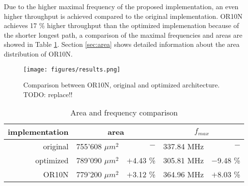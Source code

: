 Due to the higher maximal frequency of the proposed implementation, an even higher throughput is achieved compared to the original implementation. OR10N achieves 17 \% higher throughput than the optimized implemenation because of the shorter longest path, a comparison of the maximal frequencies and areas are showed in Table \ref{tab:area_cmp}. Section \ref{sec:area} shows detailed information about the area distribution of OR10N.

\begin{figure}[t!]
\centering
%
\texttt{[image: figures/results.png]}
\caption{Comparison between OR10N, original and optimized architecture. TODO: replace!!}
\label{fig:results}

\end{figure}

\begin{table}[htbp]
 \caption{Area and frequency comparison}
 \label{tab:area_cmp}
\centering\begin{tabular}{|r|r|r||r|r|} \hline
implementation & \multicolumn{2}{c||}{area} & \multicolumn{2}{c|}{$f_{max}$} \\ \hline
original & 755'608 $\mu m^2$ & $-$ & 337.84 MHz & $-$ \\ \hline
optimized & 789'090 $\mu m^2$ & $+$4.43 \% & 305.81 MHz & $-$9.48 \% \\ \hline
OR10N & 779'200 $\mu m^2$ & $+$3.12 \% & 364.96 MHz & $+$8.03 \% \\ \hline
\end{tabular}
\end{table}




